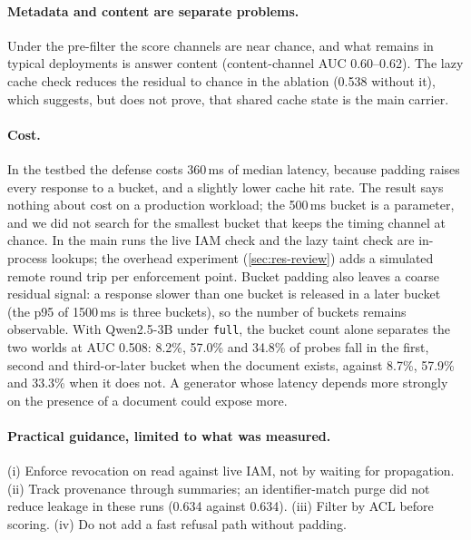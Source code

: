\paragraph{Metadata and content are separate problems.}
Under the pre-filter the score channels are near chance, and what remains in typical deployments is answer content (content-channel AUC 0.60--0.62). The lazy cache check reduces the residual to chance in the ablation (0.538 without it), which suggests, but does not prove, that shared cache state is the main carrier.

\paragraph{Cost.}
In the testbed the defense costs 360\,ms of median latency, because padding raises every response to a bucket, and a slightly lower cache hit rate. The result says nothing about cost on a production workload; the 500\,ms bucket is a parameter, and we did not search for the smallest bucket that keeps the timing channel at chance. In the main runs the live IAM check and the lazy taint check are in-process lookups; the overhead experiment (\cref{sec:res-review}) adds a simulated remote round trip per enforcement point. Bucket padding also leaves a coarse residual signal: a response slower than one bucket is released in a later bucket (the p95 of 1500\,ms is three buckets), so the number of buckets remains observable. With Qwen2.5-3B under \texttt{full}, the bucket count alone separates the two worlds at AUC 0.508: 8.2\%, 57.0\% and 34.8\% of probes fall in the first, second and third-or-later bucket when the document exists, against 8.7\%, 57.9\% and 33.3\% when it does not. A generator whose latency depends more strongly on the presence of a document could expose more.

\paragraph{Practical guidance, limited to what was measured.}
(i) Enforce revocation on read against live IAM, not by waiting for propagation. (ii) Track provenance through summaries; an identifier-match purge did not reduce leakage in these runs (0.634 against 0.634). (iii) Filter by ACL before scoring. (iv) Do not add a fast refusal path without padding.
